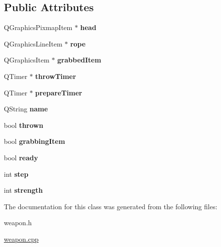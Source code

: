 \subsection*{Public Attributes}
\begin{DoxyCompactItemize}
\item 
\hypertarget{classWeapon_a99ca3e2f3038f934c8eafa5faa0f277e}{Q\-Graphics\-Pixmap\-Item $\ast$ {\bfseries head}}\label{classWeapon_a99ca3e2f3038f934c8eafa5faa0f277e}

\item 
\hypertarget{classWeapon_a9520da53d4a8fc16809e0569e2f1ee19}{Q\-Graphics\-Line\-Item $\ast$ {\bfseries rope}}\label{classWeapon_a9520da53d4a8fc16809e0569e2f1ee19}

\item 
\hypertarget{classWeapon_ace482a60a7ff5d0e6e3ffec0ac9d08ee}{Q\-Graphics\-Item $\ast$ {\bfseries grabbed\-Item}}\label{classWeapon_ace482a60a7ff5d0e6e3ffec0ac9d08ee}

\item 
\hypertarget{classWeapon_ae3fe71083afa9e426faed0d81af6bdb8}{Q\-Timer $\ast$ {\bfseries throw\-Timer}}\label{classWeapon_ae3fe71083afa9e426faed0d81af6bdb8}

\item 
\hypertarget{classWeapon_ad9b695b441f96e232409ebde76cb23ac}{Q\-Timer $\ast$ {\bfseries prepare\-Timer}}\label{classWeapon_ad9b695b441f96e232409ebde76cb23ac}

\item 
\hypertarget{classWeapon_a40c0c9733eb82073858f1b7cc492d386}{Q\-String {\bfseries name}}\label{classWeapon_a40c0c9733eb82073858f1b7cc492d386}

\item 
\hypertarget{classWeapon_a2cbddccb0e512b94787d7c0668529271}{bool {\bfseries thrown}}\label{classWeapon_a2cbddccb0e512b94787d7c0668529271}

\item 
\hypertarget{classWeapon_aac8669fed357d52b5d6d3b32a74feb54}{bool {\bfseries grabbing\-Item}}\label{classWeapon_aac8669fed357d52b5d6d3b32a74feb54}

\item 
\hypertarget{classWeapon_ae62708c1d3be48ce1a4cf2418dec52f3}{bool {\bfseries ready}}\label{classWeapon_ae62708c1d3be48ce1a4cf2418dec52f3}

\item 
\hypertarget{classWeapon_a05703d93b6af2486abd60e2493bbe37e}{int {\bfseries step}}\label{classWeapon_a05703d93b6af2486abd60e2493bbe37e}

\item 
\hypertarget{classWeapon_a4a9381f1b461ca75cf0928defe49fbc0}{int {\bfseries strength}}\label{classWeapon_a4a9381f1b461ca75cf0928defe49fbc0}

\end{DoxyCompactItemize}


The documentation for this class was generated from the following files\-:\begin{DoxyCompactItemize}
\item 
weapon.\-h\item 
\hyperlink{weapon_8cpp}{weapon.\-cpp}\end{DoxyCompactItemize}
